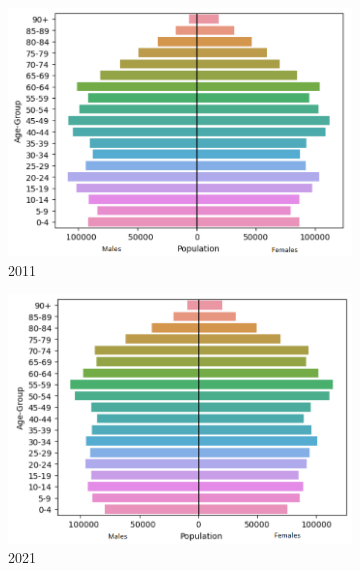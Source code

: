\documentclass[../thesis.tex]{subfiles}
\begin{document}
\begin{figure}[h!]
\centering
\begin{subfigure}{0.33\textwidth}
    \centering
    \includegraphics[width=\textwidth]{Chapters/Chapter1/Figures/Census2011a.png}
    \caption{2011}
\end{subfigure}
\hfill
\begin{subfigure}{0.33\textwidth}
    \centering
    \includegraphics[width=\textwidth]{Chapters/Chapter1/Figures/Census2021a.png}
    \caption{2021}
\end{subfigure}\hfill
\begin{subfigure}{0.33\textwidth}
    \centering

\end{subfigure}
\end{figure}
\end{document}
